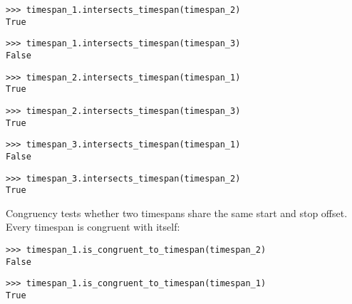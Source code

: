 \begin{comment}
<abjad>
timespan_1.intersects_timespan(timespan_2)
timespan_1.intersects_timespan(timespan_3)
timespan_2.intersects_timespan(timespan_1)
timespan_2.intersects_timespan(timespan_3)
timespan_3.intersects_timespan(timespan_1)
timespan_3.intersects_timespan(timespan_2)
</abjad>
\end{comment}

\begin{singlespacing}
\vspace{-0.5\baselineskip}
\begin{lstlisting}
>>> timespan_1.intersects_timespan(timespan_2)
True
\end{lstlisting}
\begin{lstlisting}
>>> timespan_1.intersects_timespan(timespan_3)
False
\end{lstlisting}
\begin{lstlisting}
>>> timespan_2.intersects_timespan(timespan_1)
True
\end{lstlisting}
\begin{lstlisting}
>>> timespan_2.intersects_timespan(timespan_3)
True
\end{lstlisting}
\begin{lstlisting}
>>> timespan_3.intersects_timespan(timespan_1)
False
\end{lstlisting}
\begin{lstlisting}
>>> timespan_3.intersects_timespan(timespan_2)
True
\end{lstlisting}
\end{singlespacing}

\noindent Congruency tests whether two timespans share the same start and stop
offset. Every timespan is congruent with itself:

\begin{comment}
<abjad>
timespan_1.is_congruent_to_timespan(timespan_2)
timespan_1.is_congruent_to_timespan(timespan_1)
</abjad>
\end{comment}

\begin{singlespacing}
\vspace{-0.5\baselineskip}
\begin{lstlisting}
>>> timespan_1.is_congruent_to_timespan(timespan_2)
False
\end{lstlisting}
\begin{lstlisting}
>>> timespan_1.is_congruent_to_timespan(timespan_1)
True
\end{lstlisting}
\end{singlespacing}

